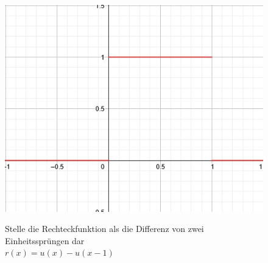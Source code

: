 \documentclass[12pt,a4paper]{article}
\newcommand{\nl}{\\[0.1cm]}
\begin{document}
\begin{minipage}{\linewidth}
\centering
\begin{minipage}{0.45\linewidth}
\begin{figure}[H]
\includegraphics[width=0.9\linewidth]{./resources/rechteck_funktion.png}
\end{figure}
\end{minipage}
\hspace{0.05\linewidth}
\begin{minipage}{0.45\linewidth}
\begin{figure}[H]
Stelle die Rechteckfunktion als die Differenz von zwei Einheitssprüngen dar\\
$r(x) = u(x) - u(x-1)$
\end{figure}
\end{minipage}
\end{minipage}
\nl
\end{document}
